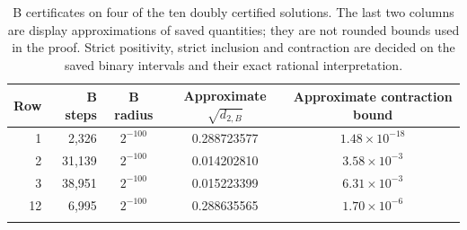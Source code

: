 \begin{longtable}{@{}rrccc@{}}
\toprule
Row & B steps & B radius & Approximate $\sqrt{d_{2,B}}$ & Approximate contraction bound\\
\midrule
1 & 2,326 & $2^{-100}$ & 0.288723577 & $1.48\times10^{-18}$\\
2 & 31,139 & $2^{-100}$ & 0.014202810 & $3.58\times10^{-3}$\\
3 & 38,951 & $2^{-100}$ & 0.015223399 & $6.31\times10^{-3}$\\
12 & 6,995 & $2^{-100}$ & 0.288635565 & $1.70\times10^{-6}$\\
\bottomrule
\caption{B certificates on four of the ten doubly certified solutions. The
last two columns are display approximations of saved quantities;
they are not rounded bounds used in the proof. Strict positivity,
strict inclusion and contraction are decided on the saved binary
intervals and their exact rational interpretation.}
\label{tab:second}
\end{longtable}
